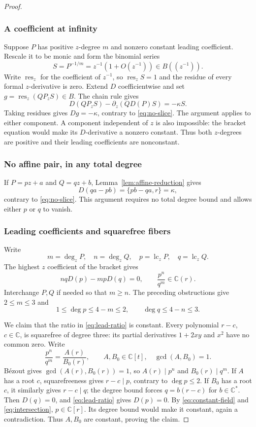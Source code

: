 \documentclass[11pt,reqno]{amsart}
\numberwithin{equation}{section}
\theoremstyle{plain}
\theoremstyle{definition}
\theoremstyle{remark}
\newcommand{\C}{\mathbb C}
\begin{document}
\begin{proof}
\subsubsection*{A coefficient at infinity}
Suppose $P$ has positive $z$-degree $m$ and nonzero constant leading coefficient. Rescale it to be monic and form the binomial series
\[
S=P^{-1/m}=z^{-1}(1+O(z^{-1}))\in B((z^{-1})).
\]
Write $\operatorname{res}_z$ for the coefficient of $z^{-1}$, so $\operatorname{res}_zS=1$ and the residue of every formal $z$-derivative is zero.
Extend $D$ coefficientwise and set $g=\operatorname{res}_z(QP_zS)\in B$.
The chain rule gives
\begin{equation}\label{eq:formal-slice}
D(QP_zS)-\partial_z(QD(P)S)=-\kappa S.
\end{equation}
Taking residues gives $Dg=-\kappa$, contrary to \eqref{eq:no-slice}.
The argument applies to either component. A component independent of $z$ is also impossible: the bracket equation would make its $D$-derivative a nonzero constant.
Thus both $z$-degrees are positive and their leading coefficients are nonconstant.

\subsubsection*{No affine pair, in any total degree}
If $P=pz+a$ and $Q=qz+b$, Lemma~\ref{lem:affine-reduction} gives
\[
D(qa-pb)=\{pb-qa,r\}=\kappa,
\]
contrary to \eqref{eq:no-slice}.
This argument requires no total degree bound and allows either $p$ or $q$
to vanish.

\subsubsection*{Leading coefficients and squarefree fibers}
Write
\[
m=\deg_zP,\quad n=\deg_zQ,\quad
p=\operatorname{lc}_zP,\quad q=\operatorname{lc}_zQ.
\]
The highest $z$ coefficient of the bracket gives
\begin{equation}\label{eq:lead-ratio}
nqD(p)-mpD(q)=0,
\qquad \frac{p^n}{q^m}\in\C(r).
\end{equation}
Interchange $P,Q$ if needed so that $m\ge n$.
The preceding obstructions give $2\le m\le3$ and
\[
1\le\deg p\le4-m\le2,\qquad \deg q\le4-n\le3.
\]

We claim that the ratio in \eqref{eq:lead-ratio} is constant.
Every polynomial $r-c$, $c\in\C$, is squarefree of degree three: its partial derivatives $1+2xy$ and $x^2$ have no common zero.
Write
\[
\frac{p^n}{q^m}=\frac{A(r)}{B_0(r)},\qquad
A,B_0\in\C[t],\quad\gcd(A,B_0)=1.
\]
B\'ezout gives $\gcd(A(r),B_0(r))=1$, so $A(r)\mid p^n$ and $B_0(r)\mid q^m$.
If $A$ has a root $c$, squarefreeness gives $r-c\mid p$, contrary to $\deg p\le2$.
If $B_0$ has a root $c$, it similarly gives $r-c\mid q$; the degree bound forces $q=b(r-c)$ for $b\in\C^*$.
Then $D(q)=0$, and \eqref{eq:lead-ratio} gives $D(p)=0$.
By \eqref{eq:constant-field} and \eqref{eq:intersection}, $p\in\C[r]$. Its degree bound would make it constant, again a contradiction.
Thus $A,B_0$ are constant, proving the claim.


\end{proof}
\end{document}
